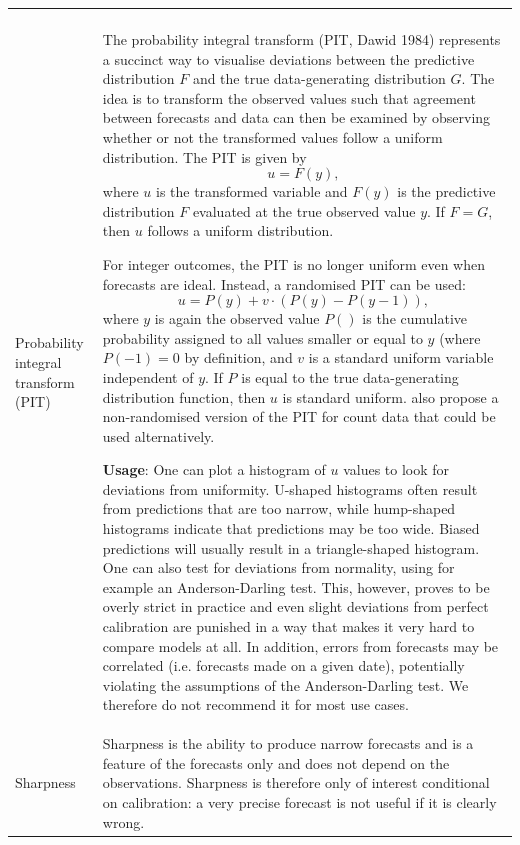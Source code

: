 \documentclass[
]{jss}
\begin{document}
\begin{CodeChunk}
\begin{longtable}[t]{>{\raggedright\arraybackslash}p{1.1in}>{\raggedright\arraybackslash}p{4.625in}}
\cellcolor{gray!6}{  \textbf{Usage}: Quantile coverage is similar to interval coverage, but conveys more information. For example, it allows us to look at the 5\% and 95\% quantile separately, instead of jointly at the 90\% prediction interval). This helps to diagnose whether it is the upper or lower end of a prediction interval that is causing problems. Plots of quantile coverage are conceptually very similar to PIT histograms.}\\
\addlinespace
Probability integral transform (PIT) & The probability integral transform (PIT, Dawid 1984) represents a succinct way to visualise deviations between the predictive distribution $F$ and the true data-generating distribution $G$. The idea is to transform the observed values such that agreement between forecasts and data can then be examined by observing whether or not the transformed values follow a uniform distribution. The PIT is given by
  $$u = F (y),$$
  where $u$ is the transformed variable and $F(y)$ is the predictive distribution $F$ evaluated at the true observed value $y$. If $F = G$, then $u$ follows a uniform distribution.

  For integer outcomes, the PIT is no longer uniform even when forecasts are ideal. Instead, a randomised PIT can be used:
  $$u = P(y) + v \cdot (P(y) - P(y - 1) ),$$
  where $y$ is again the observed value $P()$ is the cumulative probability assigned to all values smaller or equal to $y$ (where $P(-1) = 0$ by definition, and $v$ is a standard uniform variable independent of $y$. If $P$ is equal to the true data-generating distribution function, then $u$ is standard uniform.  also propose a non-randomised version of the PIT for count data that could be used alternatively.

  \textbf{Usage}:
  One can plot a histogram of $u$ values to look for deviations from uniformity. U-shaped histograms often result from predictions that are too narrow, while hump-shaped histograms indicate that predictions may be too wide. Biased predictions will usually result in a triangle-shaped histogram. One can also test for deviations from normality, using for example an Anderson-Darling test. This, however, proves to be overly strict in practice and even slight deviations from perfect calibration are punished in a way that makes it very hard to compare models at all. In addition, errors from forecasts may be correlated (i.e. forecasts made on a given date), potentially violating the assumptions of the Anderson-Darling test. We therefore do not recommend it for most use cases.\\
\addlinespace
Sharpness & Sharpness is the ability to produce narrow forecasts and is a feature of the forecasts only and does not depend on the observations. Sharpness is therefore only of interest conditional on calibration: a very precise forecast is not useful if it is clearly wrong.


\end{longtable}
\end{CodeChunk}
\end{document}
